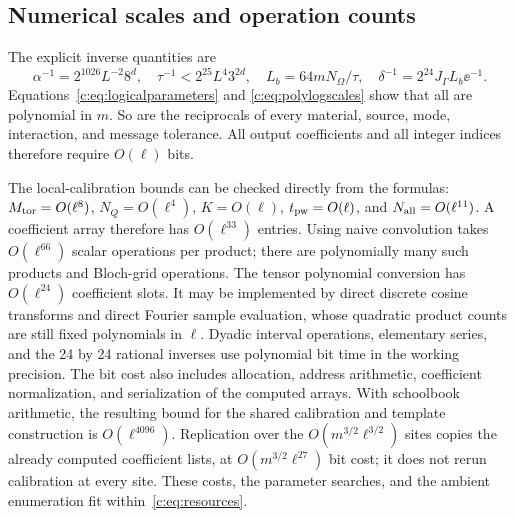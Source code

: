 \subsection{Numerical scales and operation counts}
The explicit inverse quantities are
\begin{equation}
 \alpha^{-1}=2^{1026}L^{-2}8^d,
 \quad \tau^{-1}<2^{25}L^4 3^{2d},
 \quad L_b=64mN_\Omega/\tau,
 \quad \delta^{-1}=2^{24}J_\Gamma L_b\ee^{-1}.
                                                               \label{c:eq:inverse-scales}
\end{equation}
Equations~\eqref{c:eq:logicalparameters} and
\eqref{c:eq:polylogscales} show that all are polynomial in $m$.
So are the reciprocals of every material, source, mode, interaction,
and message tolerance. All output coefficients and all integer
indices therefore require $O(\ell)$ bits.

The local-calibration bounds can be checked directly from the formulas:
$M_{\rm tor}=O(\ell^8)$, $N_Q=O(\ell^4)$, $K=O(\ell)$,
$t_{\rm pw}=O(\ell)$, and $N_{\rm all}=O(\ell^{11})$.
A coefficient array therefore has $O(\ell^{33})$ entries. Using
naive convolution takes $O(\ell^{66})$ scalar operations per product;
there are polynomially many such products and Bloch-grid operations.
The tensor polynomial conversion has $O(\ell^{24})$ coefficient slots. It may
be implemented by direct discrete cosine transforms and direct Fourier
sample evaluation, whose quadratic product counts are still fixed
polynomials in $\ell$. Dyadic interval operations, elementary series,
and the 24 by 24 rational inverses use polynomial bit time in the
working precision. The bit cost also includes allocation, address
arithmetic, coefficient normalization, and serialization of the
computed arrays. With schoolbook arithmetic, the resulting bound for
the shared calibration and template construction is
$O(\ell^{4096})$. Replication over the $O(m^{3/2}\ell^{3/2})$ sites
copies the already computed coefficient lists, at
$O(m^{3/2}\ell^{27})$ bit cost; it does not rerun calibration at
every site. These costs, the parameter searches, and the ambient
enumeration fit within~\eqref{c:eq:resources}.

